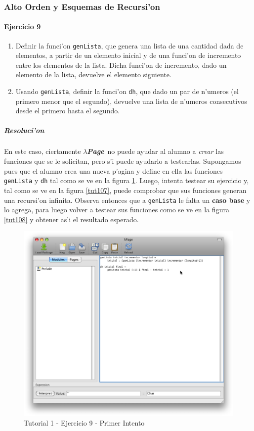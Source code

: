 \documentclass[a4paper]{article}
\newcommand{\hpage}{\textbf{\textsl{$\lambda$Page}}}
\begin{document}
\newpage
\subsubsection{Alto Orden y Esquemas de Recursi'on}
\paragraph{Ejercicio 9}
\renewcommand{\theenumi}{\Roman{enumi}}
\begin{enumerate}
	\item Definir la funci'on \texttt{genLista}, que genera una lista de una cantidad dada de elementos, a partir de un elemento inicial y de una funci'on de incremento entre los elementos de la lista.  Dicha funci'on de incremento, dado un elemento de la lista, devuelve el elemento siguiente.
	\item Usando \texttt{genLista}, definir la funci'on \texttt{dh}, que dado un par de n'umeros (el primero menor que el segundo), devuelve una lista de n'umeros consecutivos desde el primero hasta el segundo.
\end{enumerate}
\renewcommand{\theenumi}{\arabic{enumi}}
\subparagraph{Resoluci'on}En este caso, ciertamente \hpage\ no puede ayudar al alumno a \textsl{crear} las funciones que se le solicitan, pero s'i puede ayudarlo a testearlas.  Supongamos pues que el alumno crea una nueva p'agina y define en ella las funciones \texttt{genLista} y \texttt{dh} tal como se ve en la figura \ref{tut106}.  Luego, intenta testear su ejercicio y, tal como se ve en la figura \ref{tut107}, puede comprobar que sus funciones generan una recursi'on infinita.  Observa entonces que a \texttt{genLista} le falta un \textbf{caso base} y lo agrega, para luego volver a testear sus funciones como se ve en la figura \ref{tut108} y obtener as'i el resultado esperado.
\begin{figure}[hp]
	\begin{center}
        	\includegraphics[width=.75\textwidth]{pictures/tut1/06}
		\caption{Tutorial 1 - Ejercicio 9 - Primer Intento}
		\label{tut106}
	\end{center}
\end{figure}
\end{document}
